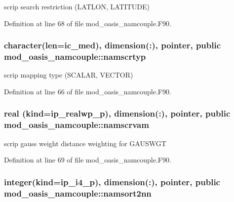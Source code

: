 scrip search restriction (L\+A\+T\+L\+O\+N, L\+A\+T\+I\+T\+U\+D\+E) 



Definition at line 68 of file mod\+\_\+oasis\+\_\+namcouple.\+F90.

\hypertarget{classmod__oasis__namcouple_a8ddbaabd22bbf485888b1df5f3578909}{
\subsubsection[{namscrtyp}]{\setlength{\rightskip}{0pt plus 5cm}character(len=ic\+\_\+med), dimension(\+:), pointer, public mod\+\_\+oasis\+\_\+namcouple\+::namscrtyp}}\label{classmod__oasis__namcouple_a8ddbaabd22bbf485888b1df5f3578909}


scrip mapping type (S\+C\+A\+L\+A\+R, V\+E\+C\+T\+O\+R) 



Definition at line 66 of file mod\+\_\+oasis\+\_\+namcouple.\+F90.

\hypertarget{classmod__oasis__namcouple_a45b410743ce74a9824d44b329ba323ba}{
\subsubsection[{namscrvam}]{\setlength{\rightskip}{0pt plus 5cm}real (kind=ip\+\_\+realwp\+\_\+p), dimension(\+:), pointer, public mod\+\_\+oasis\+\_\+namcouple\+::namscrvam}}\label{classmod__oasis__namcouple_a45b410743ce74a9824d44b329ba323ba}


scrip gauss weight distance weighting for G\+A\+U\+S\+W\+G\+T 



Definition at line 69 of file mod\+\_\+oasis\+\_\+namcouple.\+F90.

\hypertarget{classmod__oasis__namcouple_a4555b14f38928b7f0fb7f77b9c42d0a0}{
\subsubsection[{namsort2nn}]{\setlength{\rightskip}{0pt plus 5cm}integer(kind=ip\+\_\+i4\+\_\+p), dimension(\+:), pointer, public mod\+\_\+oasis\+\_\+namcouple\+::namsort2nn}}\label{classmod__oasis__namcouple_a4555b14f38928b7f0fb7f77b9c42d0a0}


